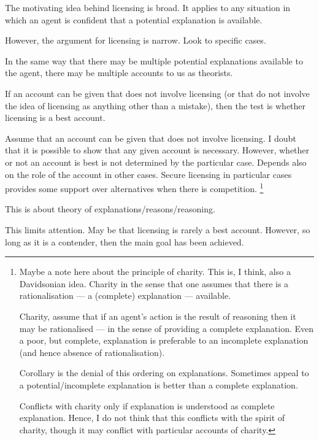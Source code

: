 \documentclass[10pt]{article}
\begin{document}
\begin{note}
  The motivating idea behind licensing is broad.
  It applies to any situation in which an agent is confident that a potential explanation is available.

  However, the argument for licensing is narrow.
  Look to specific cases.

  In the same way that there may be multiple potential explanations available to the agent, there may be multiple accounts to us as theorists.

  If an account can be given that does not involve licensing (or that do not involve the idea of licensing as anything other than a mistake), then the test is whether licensing is a best account.

  Assume that an account can be given that does not involve licensing.
  I doubt that it is possible to show that any given account is necessary.
  However, whether or not an account is best is not determined by the particular case.
  Depends also on the role of the account in other cases.
  Secure licensing in particular cases provides some support over alternatives when there is competition.\nolinebreak
  \footnote{
    Maybe a note here about the principle of charity.
    This is, I think, also a Davidsonian idea.
    Charity in the sense that one assumes that there is a rationalisation --- a (complete) explanation --- available.

    Charity, assume that if an agent's action is the result of reasoning then it may be rationalised --- in the sense of providing a complete explanation.
    Even a poor, but complete, explanation is preferable to an incomplete explanation (and hence absence of rationalisation).


  Corollary is the denial of this ordering on explanations.
  Sometimes appeal to a potential/incomplete explanation is better than a complete explanation.

  Conflicts with charity only if explanation is understood as complete explanation.
  Hence, I do not think that this conflicts with the spirit of charity, though it may conflict with particular accounts of charity.
  }

  This is about theory of explanations/reasons/reasoning.

  This limits attention.
  May be that licensing is rarely a best account.
  However, so long as it is a contender, then the main goal has been achieved.
\end{note}
\end{document}
